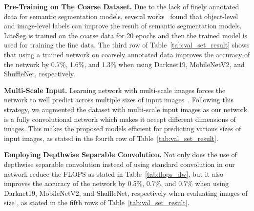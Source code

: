 \documentclass[conference,a4paper]{IEEEtran}
\begin{document}
\textbf{Pre-Training on The Coarse Dataset.} Due to the lack of finely annotated data for semantic segmentation models, several works~\cite{fine-tuning1,fine-tuning2} found that object-level and image-level labels can improve the result of semantic segmentation models. LiteSeg is trained on the coarse data for 20 epochs and then the trained model is used for training the fine data. The third row of Table~\ref{tab:val_set_result} shows that using a trained network on coarsely annotated data improves the accuracy of the network by 0.7\%, 1.6\%, and 1.3\% when using Darknet19, MobileNetV2, and ShuffleNet, respectively. 
\begin{table}[h!]
\caption{Effect of employing depthwise separable convolution to reduce the number of floating point operations, instead of standard convolution. The unit of all listed number is Giga Floating Point Operations (GFLOPs). They are measured on image size  }
	\begin{center}
	\end{center}
	
	\label{tab:flops_dw}

	\vskip -0.2in
\end{table}

\textbf{Multi-Scale Input.} Learning network with multi-scale images forces the network to well predict across multiple sizes of input images~\cite{yolo}. Following this strategy, we augmented the dataset with multi-scale input images as our network is a fully convolutional network which makes it accept different dimensions of images. This makes the proposed models efficient for predicting various sizes of input images, as stated in the fourth row of Table~\ref{tab:val_set_result}.



\textbf{Employing Depthwise Separable Convolution.} Not only does the use of depthwise separable convolution instead of using standard convolution in our network reduce the FLOPS as stated in Table~\ref{tab:flops_dw}, but it also improves the accuracy of the network by 0.5\%, 0.7\%, and 0.7\% when using Darknet19, MobileNetV2, and ShuffleNet, respectively when evaluating images of size , as stated in the fifth rows of Table~\ref{tab:val_set_result}.
\end{document}
